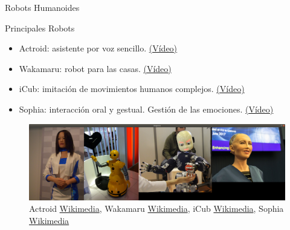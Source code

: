 \begin{frame}[fragile]{Robots Humanoides}
\vspace{10px}
\pause
{}
\begin{block}{Principales Robots}
	\begin{itemize}
		\item Actroid: asistente por voz sencillo. \href{https://www.youtube.com/watch?v=p-8GEcLRRAM}{(Vídeo)}
		\pause
		\item Wakamaru: robot para las casas. \href{https://www.youtube.com/watch?v=k6zB-HDtI_0}{(Vídeo)}
		\pause
		\item iCub: imitación de movimientos humanos complejos. \href{https://www.youtube.com/watch?v=ZcTwO2dpX8A}{(Vídeo)}
		\pause
		\item Sophia: interacción oral y gestual. Gestión de las emociones. \href{https://www.youtube.com/watch?v=S5t6K9iwcdw}{(Vídeo)}
	\end{itemize}
\end{block}
\begin{figure}
	\centering
	\pause
	\includegraphics[scale=0.12]{./EtapaModerna/Imagenes/robots_humanoides.png}
	\caption{Actroid \href{https://commons.wikimedia.org/wiki/File:Actroid_3.jpg}{Wikimedia}, Wakamaru \href{https://commons.wikimedia.org/wiki/File:Wakamaru-fullshot2011.jpg}{Wikimedia}, iCub \href{https://commons.wikimedia.org/wiki/File:ICub_Innorobo_Lyon_2014.JPG}{Wikimedia}, Sophia \href{https://es.wikipedia.org/wiki/Archivo:Sophia_(robot).jpg}{Wikimedia}}
\end{figure}
\end{frame}